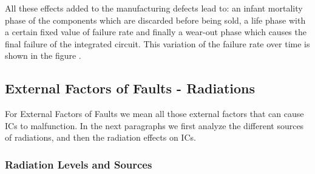 {{{		
			All these effects added to the manufacturing defects lead to: an infant mortality phase of the components which are discarded before being sold, a life phase with a certain fixed value of failure rate and finally a wear-out phase which causes the final failure of the integrated circuit. This variation of the failure rate over time is shown in the figure .
			\vspace{2cm}
		
		}%
		\subsection{External Factors of Faults - Radiations}{
			For External Factors of Faults we mean all those external factors that can cause ICs to malfunction. In the next paragraphs we first analyze the different sources of radiations, and then the radiation effects on ICs.
		
			\subsubsection{Radiation Levels and Sources}{
				
				
}}}}
